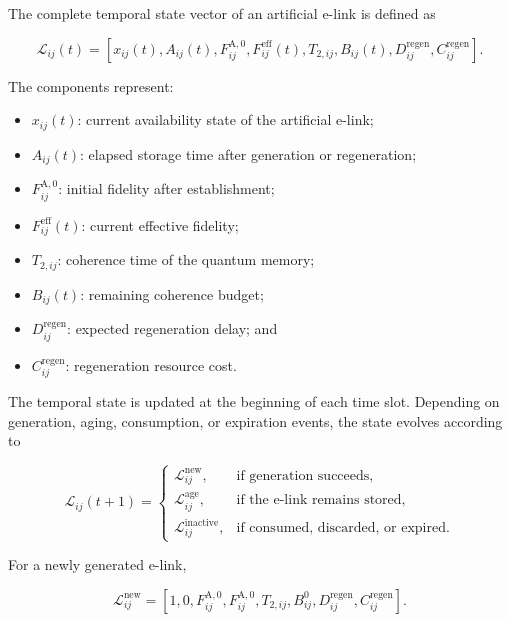 The complete temporal state vector of an artificial e-link is defined as

\begin{equation}
    \mathcal{L}_{ij}(t)
    =
    \left[
    x_{ij}(t),
    A_{ij}(t),
    F_{ij}^{\mathrm{A},0},
    F_{ij}^{\mathrm{eff}}(t),
    T_{2,ij},
    B_{ij}(t),
    D_{ij}^{\mathrm{regen}},
    C_{ij}^{\mathrm{regen}}
    \right].
\end{equation}

The components represent:

\begin{itemize}
    \item $x_{ij}(t)$: current availability state of the artificial e-link;
    \item $A_{ij}(t)$: elapsed storage time after generation or regeneration;
    \item $F_{ij}^{\mathrm{A},0}$: initial fidelity after establishment;
    \item $F_{ij}^{\mathrm{eff}}(t)$: current effective fidelity;
    \item $T_{2,ij}$: coherence time of the quantum memory;
    \item $B_{ij}(t)$: remaining coherence budget;
    \item $D_{ij}^{\mathrm{regen}}$: expected regeneration delay; and
    \item $C_{ij}^{\mathrm{regen}}$: regeneration resource cost.
\end{itemize}

The temporal state is updated at the beginning of each time slot. Depending on generation, aging, consumption, or expiration events, the state evolves according to

\begin{equation}
    \mathcal{L}_{ij}(t+1)
    =
    \begin{cases}
        \mathcal{L}_{ij}^{\mathrm{new}},
        & \text{if generation succeeds},\\
        \mathcal{L}_{ij}^{\mathrm{age}},
        & \text{if the e-link remains stored},\\
        \mathcal{L}_{ij}^{\mathrm{inactive}},
        & \text{if consumed, discarded, or expired}.
    \end{cases}
\end{equation}

For a newly generated e-link,

\begin{equation}
    \mathcal{L}_{ij}^{\mathrm{new}}
    =
    \left[
    1,
    0,
    F_{ij}^{\mathrm{A},0},
    F_{ij}^{\mathrm{A},0},
    T_{2,ij},
    B_{ij}^{0},
    D_{ij}^{\mathrm{regen}},
    C_{ij}^{\mathrm{regen}}
    \right].
\end{equation}

